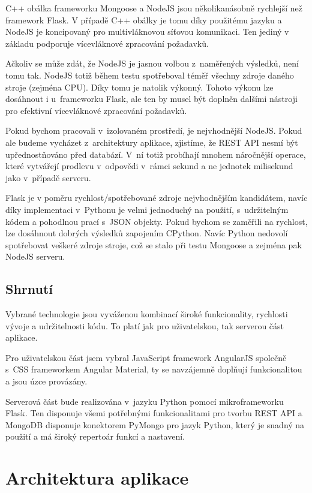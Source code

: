 C++ obálka frameworku Mongoose a NodeJS jsou několikanásobně rychlejší než framework Flask. V případě C++ obálky je tomu díky použitému jazyku a NodeJS je koncipovaný pro multivláknovou síťovou komunikaci. Ten jediný v základu podporuje vícevláknové zpracování požadavků. 

Ačkoliv se může zdát, že NodeJS je jasnou volbou z~naměřených výsledků, není tomu tak. NodeJS totiž během testu spotřeboval téměř všechny zdroje daného stroje (zejména CPU). Díky tomu je natolik výkonný. Tohoto výkonu lze dosáhnout i u~frameworku Flask, ale ten by musel být doplněn dalšími nástroji pro efektivní vícevláknové zpracování požadavků.

Pokud bychom pracovali v~izolovaném prostředí, je nejvhodnější NodeJS. Pokud ale budeme vycházet z~architektury aplikace, zjistíme, že REST API nesmí být upřednostňováno před databází. V~ní totiž probíhají mnohem náročnější operace, které vytvářejí prodlevu v~odpovědi v~rámci sekund a ne jednotek milisekund jako v~případě serveru. 

Flask je v poměru rychlost/spotřebované zdroje nejvhodnějším kandidátem, navíc díky implementaci v~Pythonu je velmi jednoduchý na použití, s~udržitelným kódem a pohodlnou prací s~JSON objekty. Pokud bychom se zaměřili na rychlost, lze dosáhnout dobrých výsledků zapojením CPython. Navíc Python nedovolí spotřebovat veškeré zdroje stroje, což se stalo při testu Mongoose a zejména pak NodeJS serveru.

\section{Shrnutí}

Vybrané technologie jsou vyváženou kombinací široké funkcionality, rychlosti vývoje a udržitelnosti kódu. To platí jak pro uživatelskou, tak serverou část aplikace.

Pro uživatelskou část jsem vybral JavaScript framework AngularJS společně s~CSS frameworkem Angular Material, ty se navzájemně doplňují funkcionalitou a jsou úzce provázány.

Serverová část bude realizována v~jazyku Python pomocí mikroframeworku Flask. Ten disponuje všemi potřebnými funkcionalitami pro tvorbu REST API a MongoDB disponuje konektorem PyMongo pro jazyk Python, který je snadný na použití a má široký repertoár funkcí a nastavení.

\chapter{Architektura aplikace}
\label{architektura}

